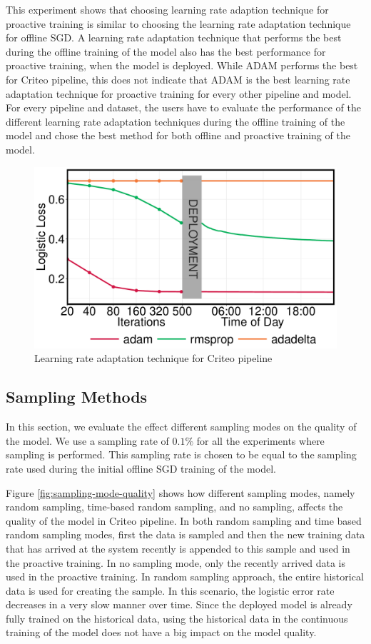 This experiment shows that choosing learning rate adaption technique for proactive training is similar to choosing the learning rate adaptation technique for offline SGD.
A learning rate adaptation technique that performs the best during the offline training of the model also has the best performance for proactive training, when the model is deployed.
While ADAM performs the best for Criteo pipeline, this does not indicate that ADAM is the best learning rate adaptation technique for proactive training for every other pipeline and model.
For every pipeline and dataset, the users have to evaluate the performance of the different learning rate adaptation techniques during the offline training of the model and chose the best method for both offline and proactive training of the model.

\begin{figure}[h!]
\includegraphics[width=\columnwidth]{../images/experiment-results/criteo-learning-rate-experiment.pdf}
\caption{Learning rate adaptation technique for Criteo pipeline}
\label{fig:criteo-learning-rate}
\end{figure}

\subsection{Sampling Methods}
In this section, we evaluate the effect different sampling modes on the quality of the model.
We use a sampling rate of $0.1\%$ for all the experiments where sampling is performed.
This sampling rate is chosen to be equal to the sampling rate used during the initial offline SGD training of the model.

Figure \ref{fig:sampling-mode-quality} shows how different sampling modes, namely random sampling, time-based random sampling, and no sampling, affects the quality of the model in Criteo pipeline.
In both random sampling and time based random sampling modes, first the data is sampled and then the new training data that has arrived at the system recently is appended to this sample and used in the proactive training.
In no sampling mode, only the recently arrived data is used in the proactive training.
In random sampling approach, the entire historical data is used for creating the sample.
In this scenario, the logistic error rate decreases in a very slow manner over time.
Since the deployed model is already fully trained on the historical data, using the historical data in the continuous training of the model does not have a big impact on the model quality.

